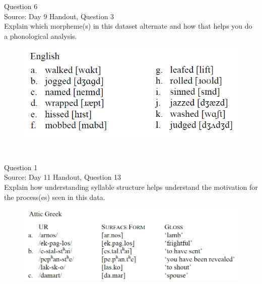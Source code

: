 \documentclass[12pt]{article}
\begin{document}
\newpage

{\large Question 6}\\

Source: Day 9 Handout, Question 3\\

Explain which morpheme(s) in this dataset alternate and how that helps you do a phonological analysis.\\

\begin{figure}[H]
\includegraphics{../images/english_past.png}
\end{figure}

\newpage

\begin{center}
\textbf{{\color{red}{\HUGE END OF EXAM}}}\\

\end{center}
\newpage

\begin{center}
\textbf{{\color{blue}{\HUGE START OF EXAM\\}}}

\textbf{{\color{blue}{\HUGE Student ID: 5540\\}}}

\textbf{{\color{blue}{\HUGE 11:10 - 11:30 AM\\}}}

\end{center}
\newpage

{\large Question 1}\\

Source: Day 11 Handout, Question 13\\

Explain how understanding syllable structure helps understand the motivation for the process(es) seen in this data.\\

\begin{figure}[H]
\includegraphics{../images/atticgreek.png}
\end{figure}
\end{document}

